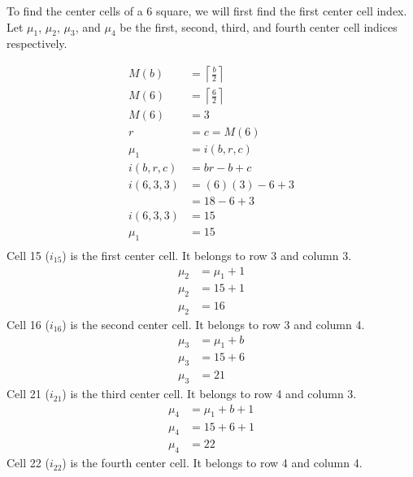 \documentclass[letterpaper, twoside,12pt]{article}
\begin{document}
    To find the center cells of a 6 square, we will first find the first center cell index. Let $\mu_1$, $\mu_2$, $\mu_3$, and $\mu_4$ be the first, second, third, and fourth center cell indices respectively.

    \begin{equation}
        \begin{split}
            M(b) &= \left\lceil \frac{b}{2} \right\rceil \\
            M(6) &= \left\lceil \frac{6}{2} \right\rceil \\
            M(6) &= 3 \\
            r &= c = M(6) \\
            \mu_1 &= i(b,r,c) \\
            i(b,r,c) &= br - b + c \\
            i(6,3,3) &= (6)(3) - 6 + 3 \\
                &= 18 - 6 + 3 \\
            i(6,3,3) &= 15 \\
            \mu_1 &= 15 \\
        \end{split}
    \end{equation}
    Cell 15 ($i_{15}$) is the first center cell. It belongs to row 3 and column 3.
    \begin{equation}
        \begin{split}
            \mu_2 &= \mu_1 + 1 \\
            \mu_2 &= 15 + 1 \\
            \mu_2 &= 16 
        \end{split}
    \end{equation}
    Cell 16 ($i_{16}$) is the second center cell. It belongs to row 3 and column 4.
    \begin{equation}
        \begin{split}
            \mu_3 &= \mu_1 + b \\
            \mu_3 &= 15 + 6 \\
            \mu_3 &= 21 
        \end{split}
    \end{equation}
    Cell 21 ($i_{21}$) is the third center cell. It belongs to row 4 and column 3.
    \begin{equation}
        \begin{split}
            \mu_4 &= \mu_1 + b + 1 \\
            \mu_4 &= 15 + 6 + 1 \\
            \mu_4 &= 22
        \end{split}
    \end{equation}
    Cell 22 ($i_{22}$) is the fourth center cell. It belongs to row 4 and column 4.
\end{document}
